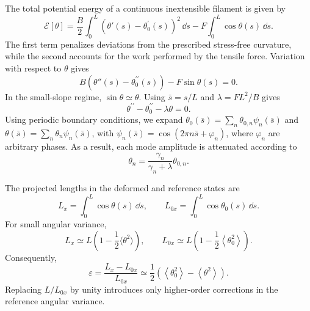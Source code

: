 \documentclass[pdflatex, twocolumn, sn-nature]{sn-jnl}
\begin{document}
The total potential energy of a continuous inextensible filament is given by 
\begin{equation}
\mathcal E[\theta]
=
\frac{B}{2}
\int_0^L
\left(
\theta'(s)-\theta^\prime_0(s)
\right)^2
\,\dd s
-
F\int_0^L \cos\theta(s)\,\dd s .
\label{eq:energy_cont_main}
\end{equation}
The first term penalizes deviations from the prescribed stress-free curvature, while the second accounts for the work performed by the tensile force. Variation with respect to $\theta$ gives
\begin{equation}
B
\left(
\theta''(s)-\theta^{\prime\prime}_0(s)
\right)
-
F\sin\theta(s)
=
0.
\label{eq:nonlinear_elastica_methods}
\end{equation}
In the small-slope regime, $\sin\theta\simeq\theta$. Using $\bar s=s/L$ and $\lambda=FL^2/B$ gives
\begin{equation}
\theta^{\prime\prime}-\theta^{\prime\prime}_0-\lambda\theta=0.
\label{eq:linear_elastica_methods}
\end{equation}
Using periodic boundary conditions, we expand $\theta_0(\bar{s})=\sum_n\theta_{0,n}\psi_n(\bar{s})$ and $\theta(\bar{s})=\sum_n\theta_n\psi_n(\bar{s})$, with $\psi_n(\bar{s})=\cos\left(2\pi n \bar{s}+ \varphi_n\right)$, where $\varphi_n$ are arbitrary phases. As a result, each mode amplitude is attenuated according to
\begin{equation}
\theta_n
=
\frac{\gamma_n}{\gamma_n+\lambda}
\theta_{0,n} .
\label{eq:filter_main_methods}
\end{equation}

The projected lengths in the deformed and reference states are
\begin{equation}
L_x=\int_0^L\cos\theta(s)\,\dd s,
\qquad
L_{0x}=\int_0^L\cos\theta_0(s)\,\dd s.
\end{equation}
For small angular variance,
\begin{equation}
L_x
\simeq
L
\left(
1-\frac{1}{2}\langle\theta^2\rangle
\right),
\qquad
L_{0x}
\simeq
L
\left(
1-\frac{1}{2}
\left\langle
\theta_0^2
\right\rangle
\right).
\end{equation}
Consequently,
\begin{equation}
\varepsilon
=
\frac{L_x-L_{0x}}{L_{0x}}
\simeq
\frac{1}{2}
\left(
\left\langle
\theta_0^2
\right\rangle
-
\left\langle\theta^2\right\rangle
\right).
\label{eq:strain_methods}
\end{equation}
Replacing $L/L_{0x}$ by unity introduces only higher-order corrections in the reference angular variance.
\end{document}
